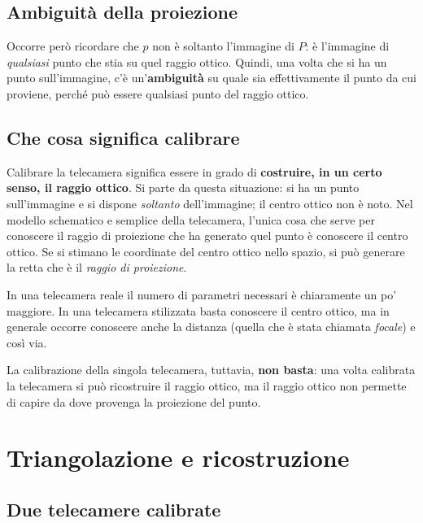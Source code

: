 \subsection{Ambiguità della proiezione}

Occorre però ricordare che $p$ non è soltanto l'immagine di $P$: è l'immagine di \emph{qualsiasi} punto che stia su quel raggio ottico. Quindi, una volta che si ha un punto sull'immagine, c'è un'\textbf{ambiguità} su quale sia effettivamente il punto da cui proviene, perché può essere qualsiasi punto del raggio ottico.

\subsection{Che cosa significa calibrare}

Calibrare la telecamera significa essere in grado di \textbf{costruire, in un certo senso, il raggio ottico}. Si parte da questa situazione: si ha un punto sull'immagine e si dispone \emph{soltanto} dell'immagine; il centro ottico non è noto. Nel modello schematico e semplice della telecamera, l'unica cosa che serve per conoscere il raggio di proiezione che ha generato quel punto è conoscere il centro ottico. Se si stimano le coordinate del centro ottico nello spazio, si può generare la retta che è il \emph{raggio di proiezione}.

In una telecamera reale il numero di parametri necessari è chiaramente un po' maggiore. In una telecamera stilizzata basta conoscere il centro ottico, ma in generale occorre conoscere anche la distanza (quella che è stata chiamata \emph{focale}) e così via.

La calibrazione della singola telecamera, tuttavia, \textbf{non basta}: una volta calibrata la telecamera si può ricostruire il raggio ottico, ma il raggio ottico non permette di capire da dove provenga la proiezione del punto.

\section{Triangolazione e ricostruzione}

\subsection{Due telecamere calibrate}

